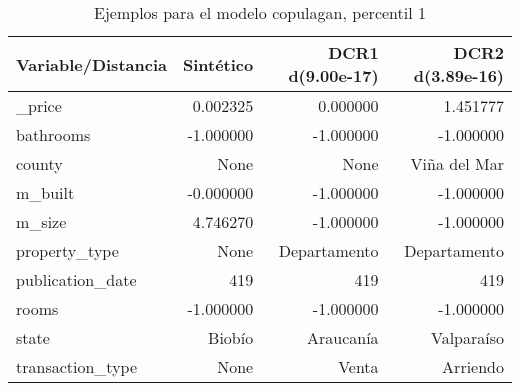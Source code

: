 \begin{table}[H]
\centering
\fontsize{10}{14}\selectfont
\caption{Ejemplos para el modelo copulagan, percentil 1}
\label{table-example-economicos-b-3-copulagan-1p}
\begin{tabular}{|l|r|r|r|}
\hline
\rowcolor[gray]{0.8}
Variable/Distancia & Sintético & DCR1 d(9.00e-17) & DCR2 d(3.89e-16) \\
\hline \_price & \cellcolor[rgb]{0.9, 0.54, 0.52} 0.002325 & \cellcolor[rgb]{0.9, 0.54, 0.52} 0.000000 & 1.451777 \\
\hline bathrooms & \cellcolor[rgb]{0.9, 0.54, 0.52} -1.000000 & \cellcolor[rgb]{0.9, 0.54, 0.52} -1.000000 & \cellcolor[rgb]{0.9, 0.54, 0.52} -1.000000 \\
\hline county & \cellcolor[rgb]{0.9, 0.54, 0.52} None & \cellcolor[rgb]{0.9, 0.54, 0.52} None & Viña del Mar \\
\hline m\_built & \cellcolor[rgb]{0.9, 0.54, 0.52} -0.000000 & \cellcolor[rgb]{0.9, 0.54, 0.52} -1.000000 & \cellcolor[rgb]{0.9, 0.54, 0.52} -1.000000 \\
\hline m\_size & \cellcolor[rgb]{0.9, 0.54, 0.52} 4.746270 & -1.000000 & -1.000000 \\
\hline property\_type & \cellcolor[rgb]{0.9, 0.54, 0.52} None & Departamento & Departamento \\
\hline publication\_date & \cellcolor[rgb]{0.9, 0.54, 0.52} 419 & \cellcolor[rgb]{0.9, 0.54, 0.52} 419 & \cellcolor[rgb]{0.9, 0.54, 0.52} 419 \\
\hline rooms & \cellcolor[rgb]{0.9, 0.54, 0.52} -1.000000 & \cellcolor[rgb]{0.9, 0.54, 0.52} -1.000000 & \cellcolor[rgb]{0.9, 0.54, 0.52} -1.000000 \\
\hline state & \cellcolor[rgb]{0.9, 0.54, 0.52} Biobío & Araucanía & Valparaíso \\
\hline transaction\_type & \cellcolor[rgb]{0.9, 0.54, 0.52} None & Venta & Arriendo \\
\hline
\end{tabular}
\end{table}
